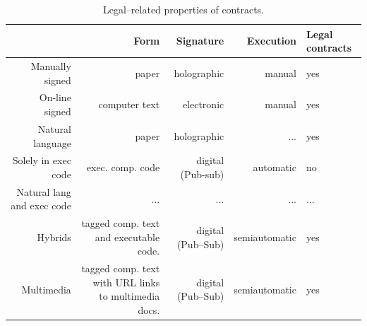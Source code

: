 \documentclass[12pt]{report} %
\begin{document}
\begin{table}
 \begin{center}
  {\scriptsize
 \begin{tabular}{|N|N|N|N|K|} %
  \hline
                {\textbf{ }}  
     & Form
     & Signature 
     & Execution
     & Legal contracts\\
    \hline
    
   Manually signed
    & paper 
    & holographic
    & manual 
    & yes\\
    \hline
    
   On-line signed
    & computer text 
    & electronic
    & manual
    & yes\\
    \hline 
 
   Natural language
    & paper
    & holographic
    & ... 
    & yes\\
    \hline 
 
   Solely in exec code
    & exec. comp. code
    & digital (Pub-sub)
    & automatic
    & no\\
    \hline 
    
   Natural lang and exec code
    & ... 
    & ...
    & ... 
    & ...\\
    \hline 
 
   Hybrids
    & tagged comp. text and executable code.
    & digital (Pub--Sub)
    & semiautomatic
    & yes\\
    \hline 
    
  Multimedia
    & tagged comp. text with URL links to multimedia docs.
    & digital (Pub--Sub)
    & semiautomatic
    & yes\\
    \hline 
    
  \end{tabular}
  } %
 \end{center}
 \caption{Legal--related properties of contracts.}
 \label{table:contcompare}
\end{table}
 



 
 
\end{document}
